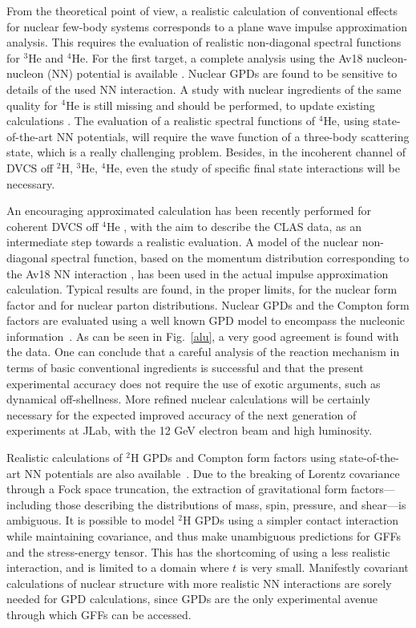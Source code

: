 From the theoretical point of view, a realistic calculation 
of conventional effects for
nuclear few-body systems corresponds to a plane wave impulse approximation 
 analysis. This requires the evaluation of realistic non-diagonal spectral
functions for $^3$He and $^4$He.
For the first target, a complete analysis using the Av18
nucleon-nucleon (NN) potential is available
\cite{Scopetta:2004kj,Scopetta:2009sn,Rinaldi:2012pj,
Rinaldi:2012ft,Rinaldi:2014bba}.
Nuclear GPDs are found to be sensitive to details of 
the used NN interaction.
A study with nuclear ingredients of the same quality
for $^4$He is still missing and should be performed, to update 
existing calculations \cite{Guzey:2003jh,Liuti:2005gi}. 
The evaluation of a realistic spectral functions of $^4$He,
using state-of-the-art NN potentials,
will require the wave function of a three-body scattering state, 
which is a really challenging problem.
Besides, in the incoherent channel of DVCS off $^2$H, $^3$He, $^4$He,
even the study of specific final state interactions will be necessary.

An encouraging approximated calculation has been recently
performed for coherent DVCS off $^4$He \cite{PhysRevC.98.015203}, with the aim to
describe the CLAS data, as an intermediate
step towards a realistic evaluation.
A model of the nuclear non-diagonal spectral function, 
based on the momentum distribution
corresponding to the Av18 NN interaction
\cite{PhysRevC.67.034003}, has been used in the 
actual impulse approximation
calculation. Typical results
are found, in the proper limits, for the nuclear form factor
and for nuclear parton distributions.
Nuclear GPDs and the
Compton form factors are evaluated using
a well known GPD model to encompass the nucleonic information~\cite{Goloskokov:2011rd}. 
As can be seen in Fig.~\ref{alu}, a very good agreement 
is found with the data.  
One can conclude that 
a careful analysis of the reaction mechanism in terms of
basic conventional ingredients is successful and that
the present experimental accuracy does not require
the use of exotic arguments, such as dynamical off-shellness.
More refined nuclear calculations will be certainly necessary for 
the expected improved accuracy of the next generation of experiments 
at JLab, with the 12 GeV electron beam and high luminosity. 

Realistic calculations of $^2$H GPDs and Compton form factors using
state-of-the-art NN potentials are also available~\cite{Cano:2003ju}.
Due to the breaking of Lorentz covariance through a Fock space truncation,
the extraction of gravitational form factors---including those describing
the distributions of mass, spin, pressure, and shear---is ambiguous.
It is possible to model $^2$H GPDs using
a simpler contact interaction while maintaining covariance, and thus
make unambiguous predictions for GFFs and the stress-energy tensor.
This has the shortcoming of using a less realistic interaction,
and is limited to a domain where $t$ is very small. Manifestly covariant
calculations of nuclear structure with more realistic NN interactions
are sorely needed for GPD calculations, since GPDs are the only experimental
avenue through which GFFs can be accessed.
  
